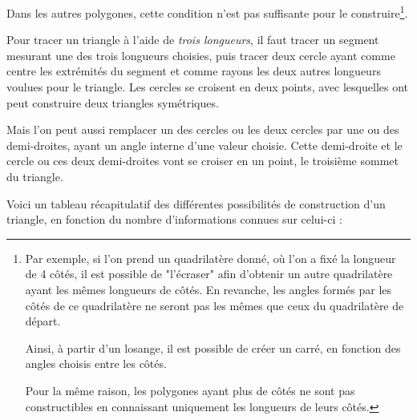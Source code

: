 \documentclass[a4paper]{article}
\begin{document}
			Dans les autres polygones, cette condition n'est pas suffisante pour le construire\footnote{
				Par exemple, si l'on prend un quadrilatère donné, 
				où l'on a fixé la longueur de 4 côtés,
				il est possible de "l'écraser" afin d'obtenir un autre
				quadrilatère ayant les mêmes longueurs de côtés.
				En revanche, les angles formés par les côtés de ce quadrilatère 
				ne seront pas les mêmes que ceux du quadrilatère de départ.
				
				Ainsi, à partir d'un losange, il est possible de créer un carré, 
				en fonction des angles choisis entre les côtés.

				Pour la même raison, 
				les polygones ayant plus de côtés ne sont pas constructibles
				en connaissant uniquement les longueurs de leurs côtés.
			}.

			\medbreak

			Pour tracer un triangle à l'aide de \textit{trois longueurs}, 
			il faut tracer un segment mesurant une des trois longueurs choisies, 
			puis tracer deux cercle ayant comme centre les extrémités du segment 
			et comme rayons les deux autres longueurs voulues pour le triangle. 
			Les cercles se croisent en deux points, 
			avec lesquelles ont peut construire deux triangles symétriques.

			\medbreak

			Mais l'on peut aussi remplacer un des cercles ou les deux 
			cercles par une ou des demi-droites, 
			ayant un angle interne d'une valeur choisie. 
			Cette demi-droite et le cercle ou ces deux demi-droites 
			vont se croiser en un point, le troisième sommet du triangle.

			Voici un tableau récapitulatif des différentes possibilités de construction d'un triangle, 
			en fonction du nombre d'informations connues sur celui-ci :
\end{document}
